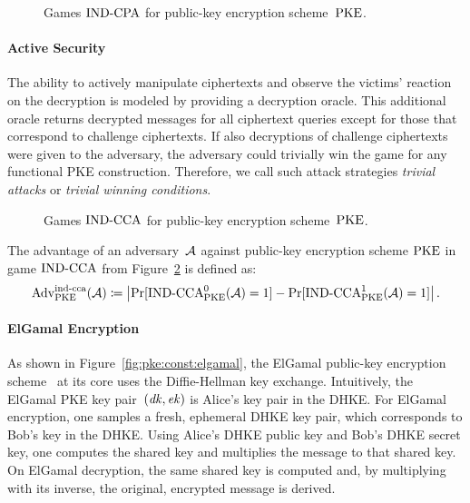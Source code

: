 \documentclass[a4paper,orivec]{llncs}
\begin{document}
\begin{figure}[!ht]
    \centering
    \nicoresetlinenr%
    \fbox{%
        \scalebox{\codescalefactor}{%
        }%
    }
    \caption{%
        Games ${\mathrm{IND}\text{-}\mathrm{CPA}}$ for public-key encryption scheme~$\mathrm{PKE}$.
    }
    \label{fig:pke:ind:cpa}
\end{figure}

\paragraph{Active Security}
The ability to actively manipulate ciphertexts and observe the victims' reaction on the decryption is modeled by providing a decryption oracle.
This additional oracle returns decrypted messages for all ciphertext queries except for those that correspond to challenge ciphertexts.
If also decryptions of challenge ciphertexts were given to the adversary, the adversary could trivially win the game for any functional PKE construction.
Therefore, we call such attack strategies \emph{trivial attacks} or \emph{trivial winning conditions}.

\begin{figure}[!ht]
    \centering
    \nicoresetlinenr%
    \fbox{%
        \scalebox{\codescalefactor}{%
        }%
    }
    \caption{%
        Games ${\mathrm{IND}\text{-}\mathrm{CCA}}$ for public-key encryption scheme~$\mathrm{PKE}$.
    }
    \label{fig:pke:ind}
\end{figure}

The advantage of an adversary~$\mathcal{A}$ against public-key encryption scheme $\mathrm{PKE}$ in game ${\mathrm{IND}\text{-}\mathrm{CCA}}$ from Figure~\ref{fig:pke:ind} is defined as:
\[
\mathrm{Adv}_{\mathrm{PKE}}^{\mathrm{ind}\text{-}\mathrm{cca}}(\mathcal{A})\coloneqq\left|\Pr[{\mathrm{IND}\text{-}\mathrm{CCA}}_{\mathrm{PKE}}^0(\mathcal{A})=1]-\Pr[{\mathrm{IND}\text{-}\mathrm{CCA}}_{\mathrm{PKE}}^1(\mathcal{A})=1]\right|\text{.}
\]

\paragraph{ElGamal Encryption}
As shown in Figure~\ref{fig:pke:const:elgamal}, the ElGamal public-key encryption scheme~\cite{ElGamal85} at its core uses the Diffie-Hellman key exchange.
Intuitively, the ElGamal PKE key pair~$(\mathit{dk},\mathit{ek})$ is Alice's key pair in the DHKE.
For ElGamal encryption, one samples a fresh, ephemeral DHKE key pair, which corresponds to Bob's key in the DHKE.
Using Alice's DHKE public key and Bob's DHKE secret key, one computes the shared key and multiplies the message to that shared key.
On ElGamal decryption, the same shared key is computed and, by multiplying with its inverse, the original, encrypted message is derived.
\end{document}

